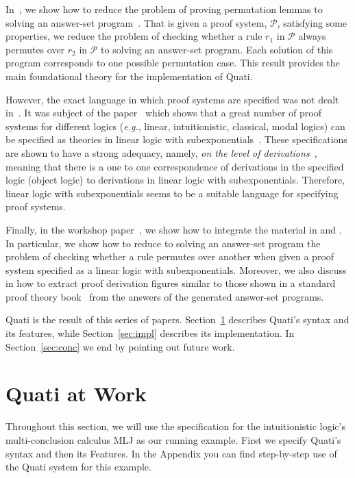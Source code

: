 \documentclass{llncs}
\newcommand\Pscr{\mathcal{P}}
\newcommand{\eg}{{\em e.g.}}
\begin{document}
In~\cite{nigam13iclp}, we show how to reduce the problem of proving permutation
lemmas to solving an answer-set program~\cite{gelfond90iclp}. That is given a proof
system, $\Pscr$, satisfying some properties, we reduce the problem 
of checking whether a rule $r_1$ in $\Pscr$ always permutes over $r_2$ in
$\Pscr$ to solving an answer-set program. Each solution of this program
corresponds to one possible permutation case. This result provides the main 
foundational theory for the implementation of Quati.

However, the exact language in which proof systems are specified was not dealt
in~\cite{nigam13iclp}. It was subject of the paper~\cite{nigam.jlc} which
shows that a great number of proof systems for different logics (\eg, linear,
intuitionistic, classical, modal logics) can be specified as theories in linear
logic with subexponentials~\cite{nigam09ppdp}. These specifications are shown to
have a strong adequacy, namely, \emph{on the level of
derivations}~\cite{nigam10jar}, meaning that there is a one to one
correspondence of derivations in the specified logic (object logic) to derivations in linear
logic with subexponentials. Therefore, linear logic with subexponentials seems
to be a suitable language for specifying proof systems. 

Finally, in the workshop paper~\cite{nigam14ebl}, we show how to integrate the material
in \cite{nigam13iclp} and \cite{nigam.jlc}. In particular, we show how to reduce
to solving an answer-set program the problem of checking whether a rule permutes
over another when given a proof system specified as a linear logic with
subexponentials. Moreover, we also discuss in \cite{nigam14ebl} how to extract
proof derivation figures similar to those shown in a standard proof theory
book~\cite{troelstra96bpt} from the answers of the generated answer-set programs. 

Quati is the result of this series of papers. Section~\ref{sec:quati} describes
Quati's syntax and its features, while Section~\ref{sec:impl} describes its implementation.
In Section~\ref{sec:conc} we end by pointing out future work.

\vspace{-4mm}

\section{Quati at Work}
\label{sec:quati}

Throughout this section, we will use the specification for the
intuitionistic logic's multi-conclusion calculus MLJ \cite{maehara54nmj} as our running 
example. First we specify Quati's syntax and then its Features. In the Appendix
you can find step-by-step use of the Quati system for this example. 
\end{document}
